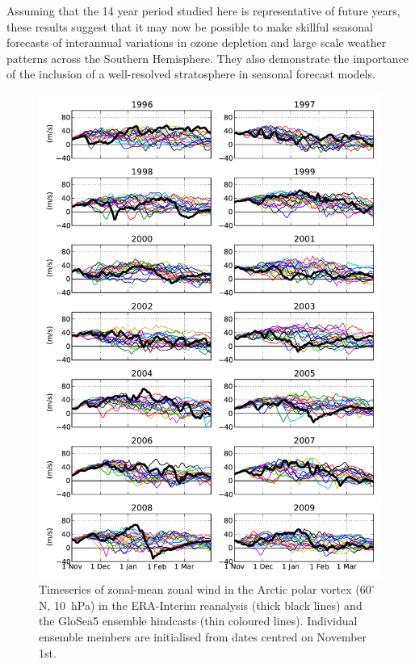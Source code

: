 Assuming that the 14 year period studied here is representative of future years,
these results suggest that it may now be possible to make skillful seasonal
forecasts of interannual variations in ozone depletion and large scale weather
patterns across the Southern Hemisphere. They also demonstrate the importance of
the inclusion of a well-resolved stratosphere in seasonal forecast models.

 \begin{figure}[p] \vspace*{-3cm} \centering
 \noindent\includegraphics[width=40pc]{figures/chapter-seasonal/zm_winds_nh_poststamp.pdf}
 \caption[Timeseries of $\overline{U}$ at 60$^{\circ}$N, 10~hPa, for all GloSea5
ensemble members.]{Timeseries of zonal-mean zonal wind in the Arctic polar
vortex ($60^{\circ}$N, 10~hPa) in the ERA-Interim reanalysis (thick black lines)
and the GloSea5 ensemble hindcasts (thin coloured lines). Individual ensemble
members are initialised from dates centred on November 1st. }
 \label{fig:nh_poststamp}
 \end{figure}

